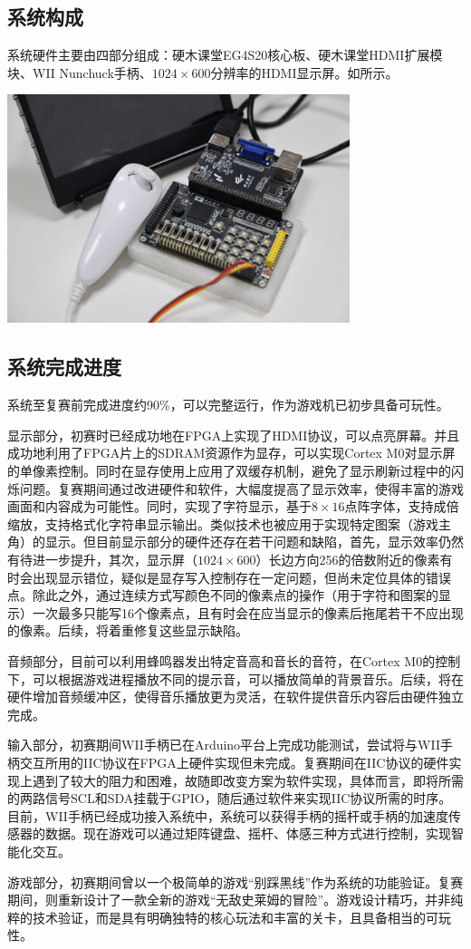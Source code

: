 \subsection{系统构成}
系统硬件主要由四部分组成：硬木课堂EG4S20核心板、硬木课堂HDMI扩展模块、WII Nunchuck手柄、$1024\times 600$分辨率的HDMI显示屏。如所示。

\begin{Figure}[系统硬件构成]
    \includegraphics[width=10cm]{image/3.jpg}
\end{Figure}


\subsection{系统完成进度}
系统至复赛前完成进度约90\%，可以完整运行，作为游戏机已初步具备可玩性。

显示部分，初赛时已经成功地在FPGA上实现了HDMI协议，可以点亮屏幕。并且成功地利用了FPGA片上的SDRAM资源作为显存，可以实现Cortex M0对显示屏的单像素控制。同时在显存使用上应用了双缓存机制，避免了显示刷新过程中的闪烁问题。复赛期间通过改进硬件和软件，大幅度提高了显示效率，使得丰富的游戏画面和内容成为可能性。同时，实现了字符显示，基于$8\times 16$点阵字体，支持成倍缩放，支持格式化字符串显示输出。类似技术也被应用于实现特定图案（游戏主角）的显示。但目前显示部分的硬件还存在若干问题和缺陷，首先，显示效率仍然有待进一步提升，其次，显示屏（$1024\times 600$）长边方向256的倍数附近的像素有时会出现显示错位，疑似是显存写入控制存在一定问题，但尚未定位具体的错误点。除此之外，通过连续方式写颜色不同的像素点的操作（用于字符和图案的显示）一次最多只能写16个像素点，且有时会在应当显示的像素后拖尾若干不应出现的像素。后续，将着重修复这些显示缺陷。

音频部分，目前可以利用蜂鸣器发出特定音高和音长的音符，在Cortex M0的控制下，可以根据游戏进程播放不同的提示音，可以播放简单的背景音乐。后续，将在硬件增加音频缓冲区，使得音乐播放更为灵活，在软件提供音乐内容后由硬件独立完成。

输入部分，初赛期间WII手柄已在Arduino平台上完成功能测试，尝试将与WII手柄交互所用的IIC协议在FPGA上硬件实现但未完成。复赛期间在IIC协议的硬件实现上遇到了较大的阻力和困难，故随即改变方案为软件实现，具体而言，即将所需的两路信号SCL和SDA挂载于GPIO，随后通过软件来实现IIC协议所需的时序。目前，WII手柄已经成功接入系统中，系统可以获得手柄的摇杆或手柄的加速度传感器的数据。现在游戏可以通过矩阵键盘、摇杆、体感三种方式进行控制，实现智能化交互。

游戏部分，初赛期间曾以一个极简单的游戏“别踩黑线”作为系统的功能验证。复赛期间，则重新设计了一款全新的游戏“无敌史莱姆的冒险”。游戏设计精巧，并非纯粹的技术验证，而是具有明确独特的核心玩法和丰富的关卡，且具备相当的可玩性。
